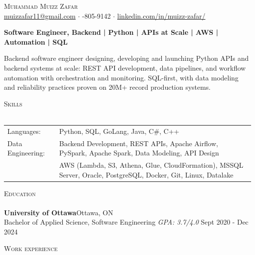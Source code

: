 \documentclass[a4paper]{article}
\newcommand{\lineunder} {
    \vspace*{-8pt} \\
    \hspace*{-18pt} \hrulefill \\
}
\newcommand{\header} [1] {
    {\hspace*{-18pt}\vspace*{6pt} \textsc{#1}}
    \vspace*{-6pt} \lineunder
}
\begin{document}
\vspace*{-40pt}

\vspace*{-10pt}
\begin{center}
	{\Huge \scshape {Muhammad Muizz Zafar}}\\
	\faSend \space \href{mailto:muizzafar11@gmail.com}{muizzafar11@gmail.com} $\cdot$ \faPhoneSquare {}-805-9142 $\cdot$ \faLinkedinSquare \space \href{https://www.linkedin.com/in/muizz-zafar/}{linkedin.com/in/muizz-zafar/}
	\\
\end{center}

\vspace{-5pt}
\begin{center}
\textbf{Software Engineer, Backend | Python | APIs at Scale | AWS | Automation | SQL}
\end{center}
\begin{center}
Backend software engineer designing, developing and launching Python APIs and backend systems at scale: REST API development, data pipelines, and workflow automation with orchestration and monitoring. SQL-first, with data modeling and reliability practices proven on 20M+ record production systems.
\end{center}

\header{Skills}
\begin{tabular}{ l l }
	Languages: 
& Python, SQL, GoLang, Java, C\#, C++ \\

Data Engineering: 
& Backend Development, REST APIs, Apache Airflow, PySpark, Apache Spark, Data Modeling, API Design\\
& AWS (Lambda, S3, Athena, Glue, CloudFormation), MSSQL Server, Oracle, PostgreSQL, Docker, Git, Linux, Datalake

\end{tabular}

\header{Education}
\textbf{University of Ottawa}\hfill Ottawa, ON\\
Bachelor of Applied Science, Software Engineering \textit{GPA: 3.7/4.0} \hfill Sept 2020 - Dec 2024\\
\vspace{2mm}

\header{Work experience}
\vspace{1.5mm}
\end{document}
